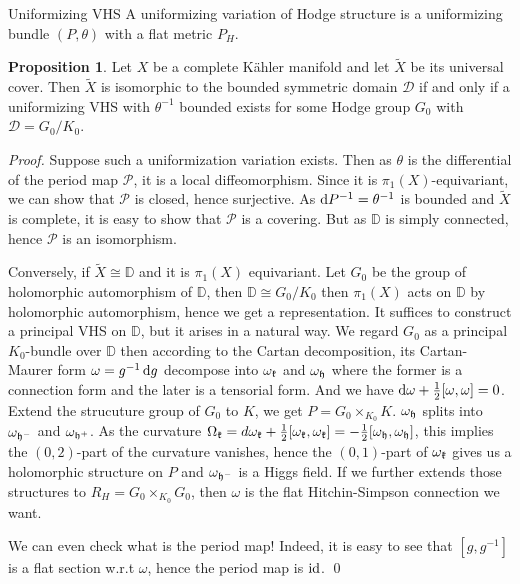 \documentclass[aspectratio=169, 10pt]{beamer}
\theoremstyle{definition}
\theoremstyle{example}
\newtheorem{proposition}[theorem]{Proposition}
\begin{document}
	\begin{frame}[allowframebreaks]{Uniformizing VHS}
		A uniformizing variation of Hodge structure is a uniformizing bundle $(P,\theta)$ with a flat metric $P_H$. 
		\begin{proposition}\label{uniformizing VHS}
			Let $X$ be a complete K\"ahler manifold and let $\widetilde{X}$ be its universal cover. Then $\widetilde{X}$ is isomorphic to the bounded symmetric domain $\mathcal{D}$ if and only if a uniformizing VHS with $\theta^{-1}$ bounded exists for some Hodge group $G_0$ with $\mathcal{D}=G_0/K_0$.
		\end{proposition}
		\noindent \textit{Proof.}
		Suppose such a uniformization variation exists. Then as $\theta$ is the differential of the period map $\mathcal{P}$, it is a local diffeomorphism. Since it is $\pi_1(X)$-equivariant, we can show that $\mathcal{P}$ is closed, hence surjective. As $\mathop{}\!\mathrm{d} P^{-1}=\theta^{-1}$ is bounded and $\widetilde{X}$ is complete, it is easy to show that $\mathcal{P}$ is a covering. But as $\mathbb{D}$ is simply connected, hence $\mathcal{P}$ is an isomorphism. 
		
		Conversely, if $\widetilde{X}\cong \mathbb{D}$ and it is $\pi_1(X)$ equivariant. Let $G_0$ be the group of holomorphic automorphism of $\mathbb{D}$, then $\mathbb{D}\cong G_0/K_0$ then $\pi_1(X)$ acts on $\mathbb{D}$ by holomorphic automorphism, hence we get a representation. It suffices to construct a principal VHS on $\mathbb{D}$, but it arises in a natural way. We regard $G_0$ as a principal $K_0$-bundle over $\mathbb{D}$ then according to the Cartan decomposition, its Cartan-Maurer form $\omega=g^{-1}\mathop{}\!\mathrm{d} g$ decompose into $\omega_{\mathfrak{k}}$ and $\omega_{\mathfrak{h}}$ where the former is a connection form and the later is a tensorial form. And we have $\mathop{}\!\mathrm{d} \omega +\frac{1}{2}[\omega,\omega]=0$. Extend the strucuture group of $G_0$ to $K$, we get $P=G_0\times_{K_0} K$. $\omega_{\mathfrak{h}}$ splits into $\omega_{\mathfrak{h}^-}$ and $\omega_{\mathfrak{h}^+}$. As the curvature $\Omega_{\mathfrak{k}}=d\omega_{\mathfrak{k}} + \frac{1}{2}[\omega_{\mathfrak{k}},\omega_{\mathfrak{k}}]=-\frac{1}{2}[\omega_{\mathfrak{h}},\omega_{\mathfrak{h}}]$, this implies the $(0,2)$-part of the curvature vanishes, hence the $(0,1)$-part of $\omega_{\mathfrak{k}}$ gives us a holomorphic structure on $P$ and $\omega_{\mathfrak{h}^-}$ is a Higgs field. If we further extends those structures to $R_H=G_0\times_{K_0} G_0$, then $\omega$ is the flat Hitchin-Simpson connection we want. 

		We can even check what is the period map! Indeed, it is easy to see that $[g,g^{-1}]$ is a flat section w.r.t $\omega$, hence the period map is $\mathrm{id}$.
		\hfill \qed
	\end{frame}
\end{document}
